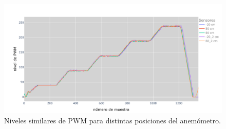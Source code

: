 \begin{figure}[H]
    \centering
    \includegraphics[width=\linewidth]{Figuras/resultados/caracterizacion/pwmCaractOptima.png}
    \caption{Niveles similares de PWM para distintas posiciones del anemómetro.}
    \label{fig:pwmCaractOptima}
\end{figure}





